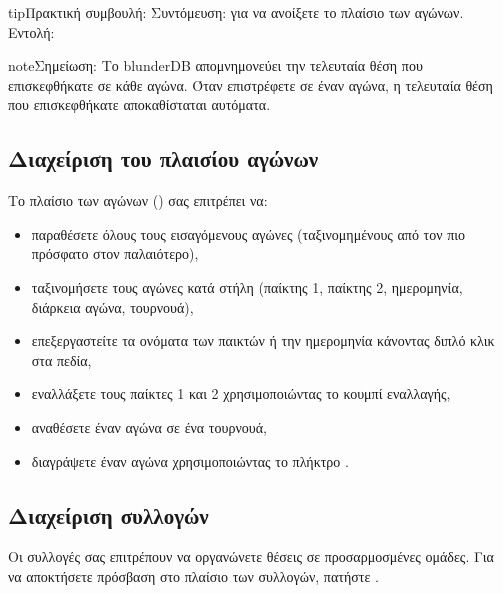 \documentclass[letterpaper,10pt,greek]{sphinxmanual}
\begin{document}
\begin{sphinxadmonition}{tip}{Πρακτική συμβουλή:}
\sphinxAtStartPar
Συντόμευση:  για να ανοίξετε το πλαίσιο των αγώνων. Εντολή: 
\end{sphinxadmonition}

\begin{sphinxadmonition}{note}{Σημείωση:}
\sphinxAtStartPar
Το blunderDB απομνημονεύει την τελευταία θέση που επισκεφθήκατε σε κάθε αγώνα. Όταν επιστρέφετε σε έναν αγώνα, η τελευταία θέση που επισκεφθήκατε αποκαθίσταται αυτόματα.
\end{sphinxadmonition}


\subsection{Διαχείριση του πλαισίου αγώνων}
\label{\detokenize{guide_utilisateur:gerer-le-panneau-des-matchs}}
\sphinxAtStartPar
Το πλαίσιο των αγώνων () σας επιτρέπει να:
\begin{itemize}
\item {} 
\sphinxAtStartPar
παραθέσετε όλους τους εισαγόμενους αγώνες (ταξινομημένους από τον πιο πρόσφατο στον παλαιότερο),

\item {} 
\sphinxAtStartPar
ταξινομήσετε τους αγώνες κατά στήλη (παίκτης 1, παίκτης 2, ημερομηνία, διάρκεια αγώνα, τουρνουά),

\item {} 
\sphinxAtStartPar
επεξεργαστείτε τα ονόματα των παικτών ή την ημερομηνία κάνοντας διπλό κλικ στα πεδία,

\item {} 
\sphinxAtStartPar
εναλλάξετε τους παίκτες 1 και 2 χρησιμοποιώντας το κουμπί εναλλαγής,

\item {} 
\sphinxAtStartPar
αναθέσετε έναν αγώνα σε ένα τουρνουά,

\item {} 
\sphinxAtStartPar
διαγράψετε έναν αγώνα χρησιμοποιώντας το πλήκτρο .

\end{itemize}


\subsection{Διαχείριση συλλογών}
\label{\detokenize{guide_utilisateur:gerer-les-collections}}
\sphinxAtStartPar
Οι συλλογές σας επιτρέπουν να οργανώνετε θέσεις σε προσαρμοσμένες ομάδες. Για να αποκτήσετε πρόσβαση στο πλαίσιο των συλλογών, πατήστε .
\end{document}
